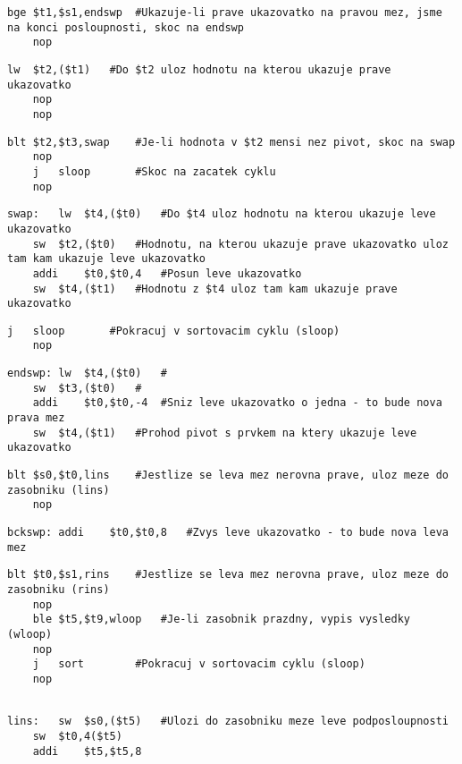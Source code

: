 \documentclass[11pt, titlepage]{article}
\begin{document}
\begin{lstlisting}[backgroundcolor=\color{Red}]   
	bge	$t1,$s1,endswp	#Ukazuje-li prave ukazovatko na pravou mez, jsme na konci posloupnosti, skoc na endswp
	nop
\end{lstlisting}
\begin{lstlisting}[backgroundcolor=\color{Yellow}]   
	lw	$t2,($t1)	#Do $t2 uloz hodnotu na kterou ukazuje prave ukazovatko
	nop
	nop
\end{lstlisting}
\begin{lstlisting}[backgroundcolor=\color{Red}]   
	blt	$t2,$t3,swap	#Je-li hodnota v $t2 mensi nez pivot, skoc na swap
	nop
	j	sloop		#Skoc na zacatek cyklu
	nop
\end{lstlisting}
\begin{lstlisting}[backgroundcolor=\color{Yellow}]   
swap:	lw	$t4,($t0)	#Do $t4 uloz hodnotu na kterou ukazuje leve ukazovatko
	sw	$t2,($t0)	#Hodnotu, na kterou ukazuje prave ukazovatko uloz tam kam ukazuje leve ukazovatko
	addi	$t0,$t0,4	#Posun leve ukazovatko
	sw	$t4,($t1)	#Hodnotu z $t4 uloz tam kam ukazuje prave ukazovatko
\end{lstlisting}
\begin{lstlisting}[backgroundcolor=\color{Red}]   
	j	sloop		#Pokracuj v sortovacim cyklu (sloop)
	nop
\end{lstlisting}
\begin{lstlisting}[backgroundcolor=\color{Yellow}] 
endswp:	lw	$t4,($t0)	#
	sw	$t3,($t0)	#
	addi	$t0,$t0,-4	#Sniz leve ukazovatko o jedna - to bude nova prava mez
	sw	$t4,($t1)	#Prohod pivot s prvkem na ktery ukazuje leve ukazovatko
\end{lstlisting}
\begin{lstlisting}[backgroundcolor=\color{Red}]   
	blt	$s0,$t0,lins	#Jestlize se leva mez nerovna prave, uloz meze do zasobniku (lins)
	nop
\end{lstlisting}
\begin{lstlisting}
bckswp:	addi	$t0,$t0,8	#Zvys leve ukazovatko - to bude nova leva mez
\end{lstlisting}
\begin{lstlisting}[backgroundcolor=\color{Red}]   
	blt	$t0,$s1,rins	#Jestlize se leva mez nerovna prave, uloz meze do zasobniku (rins)
	nop
	ble	$t5,$t9,wloop	#Je-li zasobnik prazdny, vypis vysledky (wloop)
	nop
	j	sort		#Pokracuj v sortovacim cyklu (sloop)
	nop
\end{lstlisting}
\begin{lstlisting}

lins:	sw	$s0,($t5)	#Ulozi do zasobniku meze leve podposloupnosti 
	sw	$t0,4($t5)
	addi	$t5,$t5,8
\end{lstlisting}
\end{document}
